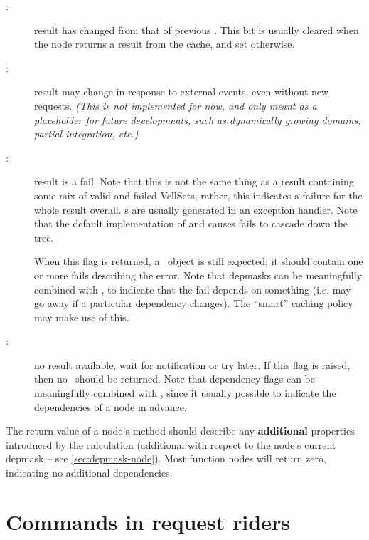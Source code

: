   \begin{description}
  
  \item[:] result has changed from that of previous \Request. This
    bit is usually cleared when the node returns a result  from the cache, and
    set otherwise.

  \item[:] result may change in response to external events,
    even without new requests. {\em (This is not implemented for now, and only meant
    as a placeholder for future developments, such as dynamically growing
    domains, partial integration, etc.)}

  \item[:] result is a fail. Note that this is not the same thing as
    a result containing some mix of valid and failed VellSets; rather, this
    indicates a failure for the whole result overall. s are usually
    generated in an exception handler. Note that the default implementation of
     and  causes fails to cascade down the
    tree.

    When this flag is returned, a \Result\ object is still expected; it should
    contain one or more fails describing the error. Note that depmasks can be
    meaningfully combined with , to indicate that the fail depends on
    something (i.e. may go away if a particular dependency changes). The
    ``smart'' caching policy may make use of this. 

  \item[:] no result available, wait for notification or try later.
    If this flag is raised, then no \Result\ should be returned. Note that
    dependency flags can be meaningfully combined with , since it
    usually possible to indicate the dependencies of a node in advance.

  \end{description}
  
  The return value of a node's  method should describe any {\bf
  additional} properties introduced by the  calculation
  (additional with respect to the node's current depmask -- see
  \ref{sec:depmask-node}). Most function nodes will return zero, indicating
  no additional dependencies.

\section{Commands in request riders}
\label{sec:rider}

